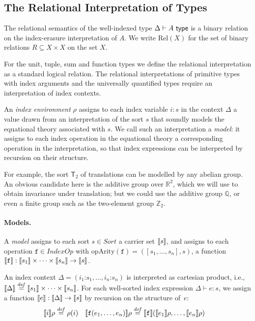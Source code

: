 \documentclass{sigplanconf}
\newcommand{\SynTransl}[1]{\mathsf{T}_#1}
\newcommand{\Rel}{\mathrm{Rel}}
\newcommand{\SortSet}{\mathit{Sort}}
\newcommand{\IndexOpSet}{\mathit{IndexOp}}
\newcommand{\indexOp}[1]{\textup{\texttt{#1}}}
\newcommand{\indexOpArity}{\mathrm{opArity}}
\newcommand{\isType}{\textup{\textsf{ type}}}
\newcommand{\isDefinedAs}{\stackrel{\mathit{def}}=}
\theoremstyle{examplestyle}
\theoremstyle{restatementstyle}
\begin{document}
\subsection{The Relational Interpretation of Types}
\label{sec:relational-semantics}

The relational semantics of the well-indexed type
$\Delta \vdash A \isType$ is a binary relation on the index-erasure
interpretation of $A$. We write $\Rel(X)$ for the set
of binary relations $R \subseteq X \times X$ on the set $X$.

For the unit, tuple, sum and function types we define the
relational interpretation as a standard logical relation. The
relational interpretations of primitive types with index arguments and
the universally quantified types require an interpretation of index
contexts.

An \emph{index environment} $\rho$ assigns to each index variable $i:s$
in the context $\Delta$ a value drawn from an interpretation of
the sort $s$ that soundly models the equational theory associated with $s$. We call
such an interpretation a \emph{model}: it assigns to each index operation in the equational 
theory a corresponding operation in the interpretation, so that index expressions 
can be interpreted by recursion on their structure. 

For example, the sort $\SynTransl{2}$ of translations can be modelled by
any abelian group. An obvious candidate here is the additive group over 
$\mathbb R^2$, which we will use to obtain invariance under translation;
but we could use the additive group $\mathbb Q$, or even a finite group such as the 
two-element group $\mathbb Z_2$. 

\paragraph{Models.}
A \emph{model} 
assigns to each sort $s \in \SortSet$ a
carrier set $\llbracket s \rrbracket$, and assigns to each operation $\texttt{f}
\in \IndexOpSet$ with $\indexOpArity(\texttt{f}) =
([s_1,\ldots,s_n],s)$, a function $\llbracket \texttt{f} \rrbracket :
\llbracket s_1 \rrbracket\times\cdots\times\llbracket s_n \rrbracket \to \llbracket s \rrbracket$.

An index context $\Delta = (i_1\mathord:s_1,\ldots,i_n\mathord:s_n)$ is
interpreted as cartesian product, i.e., $\semSort{\Delta} \isDefinedAs \semSort{s_1}
\times\cdots \times \semSort{s_n}$. 
For each well-sorted index expression $\Delta \vdash
e : s$, we assign a function $\llbracket e \rrbracket : \llbracket \Delta \rrbracket \to
\llbracket s \rrbracket$ by recursion on the structure of~$e$:
\begin{align*}
\semIndexExp{i} \rho & \isDefinedAs \rho(i) &
\semIndexExp{\indexOp{f}(e_1, \ldots, e_n)} \rho & \isDefinedAs \semIndexExp{\indexOp{f}}(
\semIndexExp{e_1}\rho,\ldots,\semIndexExp{e_n}\rho)
\end{align*}
\end{document}
